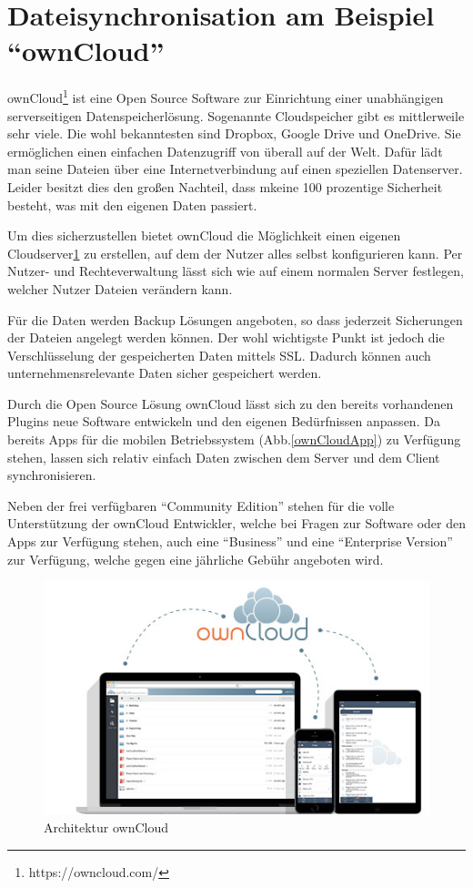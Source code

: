 \section{Dateisynchronisation am Beispiel ``ownCloud''}
\label{sec:datasync}

ownCloud\footnote{https://owncloud.com/} ist eine Open Source Software zur Einrichtung einer unabhängigen serverseitigen Datenspeicherlösung. Sogenannte Cloudspeicher gibt es mittlerweile sehr viele. Die wohl bekanntesten sind Dropbox, Google Drive und OneDrive. Sie ermöglichen einen einfachen Datenzugriff von überall auf der Welt. Dafür lädt man seine Dateien über eine Internetverbindung auf einen speziellen Datenserver. Leider besitzt dies den großen Nachteil, dass mkeine 100 prozentige Sicherheit besteht, was mit den eigenen Daten passiert.

Um dies sicherzustellen bietet ownCloud die Möglichkeit einen eigenen Cloudserver\ref{Architektur} zu erstellen, auf dem der Nutzer alles selbst konfigurieren kann. Per Nutzer- und Rechteverwaltung lässt sich wie auf einem normalen Server festlegen, welcher Nutzer Dateien verändern kann.

Für die Daten werden Backup Lösungen angeboten, so dass jederzeit Sicherungen der Dateien angelegt werden können. Der wohl wichtigste Punkt ist jedoch die Verschlüsselung der gespeicherten Daten mittels \ac{SSL}. Dadurch können auch unternehmensrelevante Daten sicher gespeichert werden.

Durch die Open Source Lösung ownCloud lässt sich zu den bereits vorhandenen Plugins neue Software entwickeln und den eigenen Bedürfnissen anpassen. Da bereits Apps für die mobilen Betriebssystem (Abb.\ref{ownCloudApp}) zu Verfügung stehen, lassen sich relativ einfach Daten zwischen dem Server und dem Client synchronisieren.

Neben der frei verfügbaren ``Community Edition'' stehen für die volle Unterstützung der ownCloud Entwickler, welche bei Fragen zur Software oder den Apps zur Verfügung stehen, auch eine ``Business'' und eine ``Enterprise Version'' zur Verfügung, welche gegen eine jährliche Gebühr angeboten wird.\cite[]{WEB:OWNCLOUD:2014}

\hspace{2 cm}

\begin{figure}[htb]
	\includegraphics[width=\textwidth]{Bilder/architecture}
	\caption{Architektur ownCloud}
	\label{Architektur}
\end{figure}

